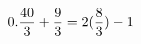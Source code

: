 \documentclass[preview]{standalone}
\begin{document}
\begin{align*}
\special{dvisvgm:raw <g id='unique000'>}0.\frac{40}{3}+\frac{9}{3} = 2(\frac{8}{3})-1\special{dvisvgm:raw </g>}
\end{align*}
\end{document}
